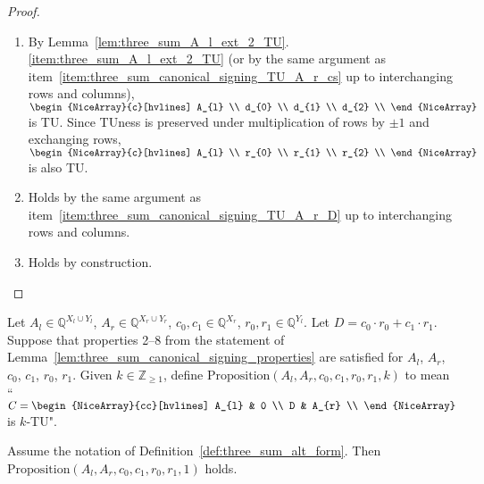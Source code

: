\begin{proof}
\begin{enumerate}
        \item By Lemma~\ref{lem:three_sum_A_l_ext_2_TU}.\ref{item:three_sum_A_l_ext_2_TU} (or by the same argument as item~\ref{item:three_sum_canonical_signing_TU_A_r_cs} up to interchanging rows and columns),\\ $\begin{NiceArray}{c}[hvlines] A_{l} \\ d_{0} \\ d_{1} \\ d_{2} \\ \end{NiceArray}$ is TU. Since TUness is preserved under multiplication of rows by $\pm 1$ and exchanging rows, $\begin{NiceArray}{c}[hvlines] A_{l} \\ r_{0} \\ r_{1} \\ r_{2} \\ \end{NiceArray}$ is also TU.
        \item Holds by the same argument as item~\ref{item:three_sum_canonical_signing_TU_A_r_D} up to interchanging rows and columns.
        \item Holds by construction.
    \end{enumerate}
\end{proof}

\begin{definition}\label{def:three_sum_alt_form}
    Let $A_{l} \in \mathbb{Q}^{X_{l} \cup Y_{l}}$, $A_{r} \in \mathbb{Q}^{X_{r} \cup Y_{r}}$, $c_{0}, c_{1} \in \mathbb{Q}^{X_{r}}$, $r_{0}, r_{1} \in \mathbb{Q}^{Y_{l}}$. Let $D = c_{0} \cdot r_{0} + c_{1} \cdot r_{1}$. Suppose that properties 2--8 from the statement of Lemma~\ref{lem:three_sum_canonical_signing_properties} are satisfied for $A_{l}$, $A_{r}$, $c_{0}$, $c_{1}$, $r_{0}$, $r_{1}$. Given $k \in \mathbb{Z}_{\geq 1}$, define $\mathrm{Proposition}(A_{l}, A_{r}, c_{0}, c_{1}, r_{0}, r_{1}, k)$ to mean ``$C = \begin{NiceArray}{cc}[hvlines] A_{l} & 0 \\ D & A_{r} \\ \end{NiceArray}$ is $k$-TU".
\end{definition}

\begin{lemma}\label{lem:three_sum_alt_form_1_TU}
    Assume the notation of Definition~\ref{def:three_sum_alt_form}. Then $\mathrm{Proposition}(A_{l}, A_{r}, c_{0}, c_{1}, r_{0}, r_{1}, 1)$ holds.
\end{lemma}

